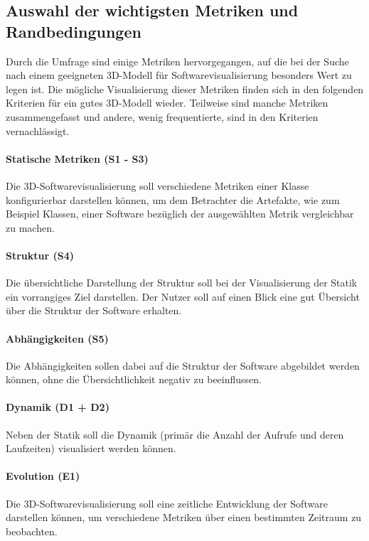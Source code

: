 \subsection{Auswahl der wichtigsten Metriken und Randbedingungen}
\label{subsec:categories}

Durch die Umfrage sind einige Metriken hervorgegangen, auf die bei der Suche nach einem geeigneten 3D-Modell für Softwarevisualisierung besonders Wert zu legen ist. Die mögliche Visualisierung dieser Metriken finden sich in den folgenden Kriterien für ein gutes 3D-Modell wieder. Teilweise sind manche Metriken zusammengefasst und andere, wenig frequentierte, sind in den Kriterien vernachlässigt.

\paragraph{Statische Metriken (S1 - S3)} Die 3D-Softwarevisualisierung soll verschiedene Metriken einer Klasse konfigurierbar darstellen können, um dem Betrachter die Artefakte, wie zum Beispiel Klassen, einer Software bezüglich der ausgewählten Metrik vergleichbar zu machen.

\paragraph{Struktur (S4)} Die übersichtliche Darstellung der Struktur soll bei der Visualisierung der Statik ein vorrangiges Ziel darstellen. Der Nutzer soll auf einen Blick eine gut Übersicht über die Struktur der Software erhalten.

\paragraph{Abhängigkeiten (S5)} Die Abhängigkeiten sollen dabei auf die Struktur der Software abgebildet werden können, ohne die Übersichtlichkeit negativ zu beeinflussen.

\paragraph{Dynamik (D1 + D2)} Neben der Statik soll die Dynamik (primär die Anzahl der Aufrufe und deren Laufzeiten) visualisiert werden können.

\paragraph{Evolution (E1)} Die 3D-Softwarevisualisierung soll eine zeitliche Entwicklung der Software darstellen können, um verschiedene Metriken über einen bestimmten Zeitraum zu beobachten.\\

